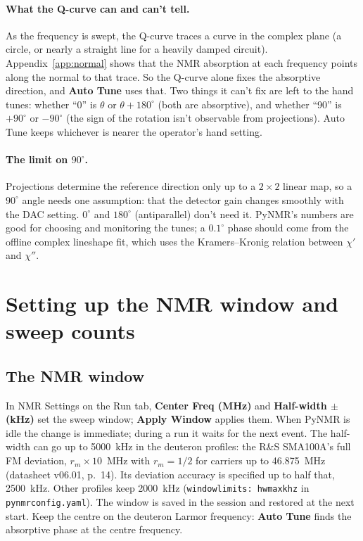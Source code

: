 \documentclass[11pt]{article}
\newcommand{\code}[1]{\texttt{\begingroup\def\_{\textunderscore\allowbreak}#1\endgroup}}
\newcommand{\btn}[1]{\textsf{\textbf{#1}}}   %
\begin{document}
\paragraph{What the Q-curve can and can't tell.} As the frequency is swept, the Q-curve traces a curve in
the complex plane (a circle, or nearly a straight line for a heavily damped circuit). Appendix~\ref{app:normal}
shows that the NMR absorption at each frequency points along the normal to that trace. So the Q-curve alone
fixes the absorptive direction, and \btn{Auto Tune} uses that. Two things it can't fix are left to the hand
tunes: whether ``0'' is $\theta$ or $\theta+180^\circ$ (both are absorptive), and whether ``90'' is $+90^\circ$ or
$-90^\circ$ (the sign of the rotation isn't observable from projections). Auto Tune keeps whichever is nearer
the operator's hand setting.

\paragraph{The limit on $90^\circ$.} Projections determine the reference direction only up to a $2\times2$
linear map, so a $90^\circ$ angle needs one assumption: that the detector gain changes smoothly with the DAC
setting. $0^\circ$ and $180^\circ$ (antiparallel) don't need it. PyNMR's numbers are good for choosing and
monitoring the tunes; a $0.1^\circ$ phase should come from the offline complex lineshape fit, which uses the
Kramers--Kronig relation between $\chi'$ and $\chi''$.

\section{Setting up the NMR window and sweep counts}

\subsection{The NMR window}
\label{sec:window}
In NMR Settings on the Run tab, \btn{Center Freq (MHz)} and \btn{Half-width $\pm$ (kHz)} set the sweep window;
\btn{Apply Window} applies them. When PyNMR is idle the change is immediate; during a run it waits for the
next event. The half-width can go up to 5000~kHz in the deuteron profiles: the R\&S SMA100A's full FM deviation,
$r_m\times10$~MHz with $r_m=1/2$ for carriers up to 46.875~MHz (datasheet v06.01, p.~14). Its deviation accuracy is
specified up to half that, 2500~kHz. Other profiles keep 2000~kHz (\code{window\_limits: hw\_max\_khz} in
\code{pynmr\_config.yaml}). The window is saved in the session and restored at the next start. Keep the centre on the
deuteron Larmor frequency: \btn{Auto Tune} finds the absorptive phase at the centre frequency.
\end{document}
